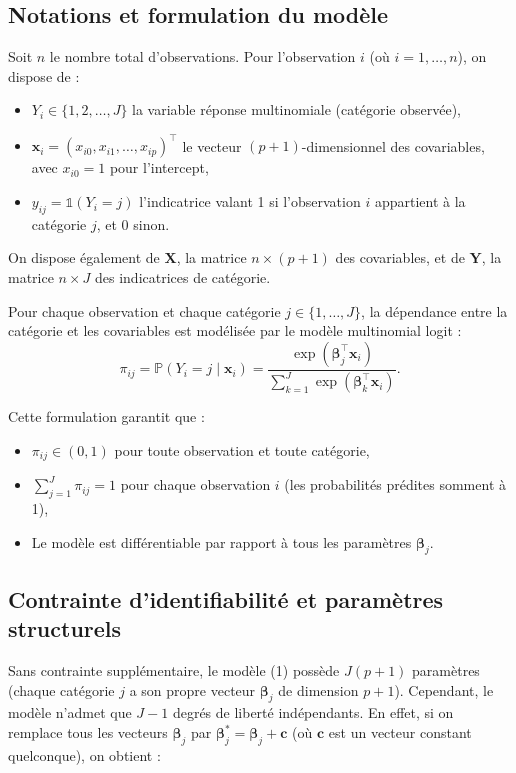 \documentclass[12pt,a4paper]{article}
\begin{document}
\subsection{Notations et formulation du modèle}

Soit $n$ le nombre total d'observations. Pour l'observation $i$ (où $i = 1, \ldots, n$), on dispose de :
\begin{itemize}
    \item $Y_i \in \{1, 2, \ldots, J\}$ la variable réponse multinomiale (catégorie observée),
    \item $\mathbf{x}_i = (x_{i0}, x_{i1}, \ldots, x_{ip})^\top$ le vecteur $(p+1)$-dimensionnel des covariables, avec $x_{i0} = 1$ pour l'intercept,
    \item $y_{ij} = \mathbb{1}(Y_i = j)$ l'indicatrice valant 1 si l'observation $i$ appartient à la catégorie $j$, et 0 sinon.
\end{itemize}

On dispose également de $\mathbf{X}$, la matrice $n \times (p+1)$ des covariables, et de $\mathbf{Y}$, la matrice $n \times J$ des indicatrices de catégorie.

Pour chaque observation et chaque catégorie $j \in \{1, \ldots, J\}$, la dépendance entre la catégorie et les covariables est modélisée par le modèle multinomial logit :
\begin{equation}\label{eq:multinomial-logit}
\pi_{ij} = \mathbb{P}(Y_i = j \mid \mathbf{x}_i) = \frac{\exp(\boldsymbol{\beta}_j^\top \mathbf{x}_i)}{\sum_{k=1}^{J} \exp(\boldsymbol{\beta}_k^\top \mathbf{x}_i)}.
\end{equation}

Cette formulation garantit que :
\begin{itemize}
    \item $\pi_{ij} \in (0, 1)$ pour toute observation et toute catégorie,
    \item $\sum_{j=1}^J \pi_{ij} = 1$ pour chaque observation $i$ (les probabilités prédites somment à 1),
    \item Le modèle est différentiable par rapport à tous les paramètres $\boldsymbol{\beta}_j$.
\end{itemize}

\subsection{Contrainte d'identifiabilité et paramètres structurels}

Sans contrainte supplémentaire, le modèle (1) possède $J(p+1)$ paramètres (chaque catégorie $j$ a son propre vecteur $\boldsymbol{\beta}_j$ de dimension $p+1$). Cependant, le modèle n'admet que $J-1$ degrés de liberté indépendants. En effet, si on remplace tous les vecteurs $\boldsymbol{\beta}_j$ par $\boldsymbol{\beta}_j^* = \boldsymbol{\beta}_j + \mathbf{c}$ (où $\mathbf{c}$ est un vecteur constant quelconque), on obtient :
\end{document}
